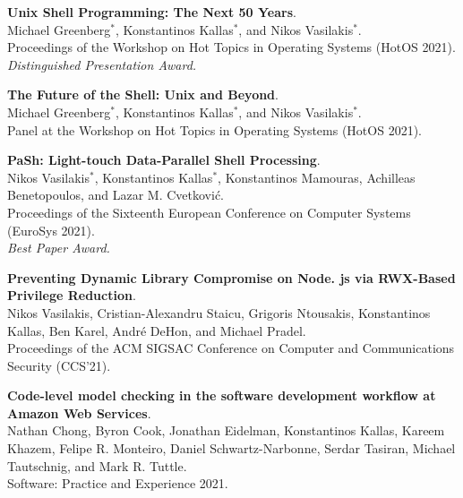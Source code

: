 \begin{minipage}{\textwidth}
\textbf{Unix Shell Programming: The Next 50 Years}. \\
Michael Greenberg$^*$, Konstantinos Kallas$^*$, and Nikos Vasilakis$^*$. \\
Proceedings of the Workshop on Hot Topics in Operating Systems (HotOS 2021).\\
 \emph{Distinguished Presentation Award.}
\end{minipage}

\begin{minipage}{\textwidth}
\textbf{The Future of the Shell: Unix and Beyond}. \\
Michael Greenberg$^*$, Konstantinos Kallas$^*$, and Nikos Vasilakis$^*$. \\
Panel at the Workshop on Hot Topics in Operating Systems (HotOS 2021).
\end{minipage}

\begin{minipage}{\textwidth}
\textbf{PaSh: Light-touch Data-Parallel Shell Processing}. \\
Nikos Vasilakis$^*$, Konstantinos Kallas$^*$, Konstantinos Mamouras, Achilleas Benetopoulos, and Lazar M. Cvetković. \\
Proceedings of the Sixteenth European Conference on Computer Systems (EuroSys 2021).\\
 \emph{Best Paper Award.}
\end{minipage}

\begin{minipage}{\textwidth}
\textbf{Preventing Dynamic Library Compromise on Node. js via RWX-Based Privilege Reduction}. \\
Nikos Vasilakis, Cristian-Alexandru Staicu, Grigoris Ntousakis, Konstantinos Kallas, Ben Karel, André DeHon, and Michael Pradel. \\
Proceedings of the ACM SIGSAC Conference on Computer and Communications Security (CCS’21).
\end{minipage}

\begin{minipage}{\textwidth}
\textbf{Code-level model checking in the software development workflow at Amazon Web Services}. \\
Nathan Chong, Byron Cook, Jonathan Eidelman, Konstantinos Kallas, Kareem Khazem, Felipe R. Monteiro, Daniel Schwartz-Narbonne, Serdar Tasiran, Michael Tautschnig, and Mark R. Tuttle. \\
Software: Practice and Experience 2021.
\end{minipage}

